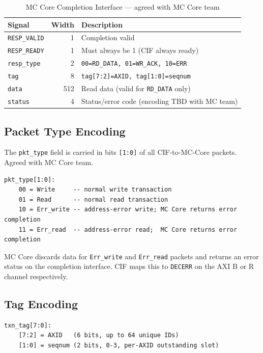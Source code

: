 \begin{table}[h]
\centering
\begin{tabular}{lrl}
\toprule
\textbf{Signal} & \textbf{Width} & \textbf{Description} \\
\midrule
\texttt{RESP\_VALID}    & 1   & Completion valid \\
\texttt{RESP\_READY}    & 1   & Must always be 1 (CIF always ready) \\
\texttt{resp\_type}     & 2   & \texttt{00=RD\_DATA, 01=WR\_ACK, 10=ERR} \\
\texttt{tag}            & 8   & \texttt{tag[7:2]=AXID, tag[1:0]=seqnum} \\
\texttt{data}           & 512 & Read data (valid for \texttt{RD\_DATA} only) \\
\texttt{status}         & 4   & Status/error code (encoding TBD with MC team) \\
\bottomrule
\end{tabular}
\caption{MC Core Completion Interface — agreed with MC Core team}
\end{table}

\subsection{Packet Type Encoding}

The \texttt{pkt\_type} field is carried in bits \texttt{[1:0]} of all CIF-to-MC-Core packets. Agreed with MC Core team.

\begin{lstlisting}
pkt_type[1:0]:
    00 = Write     -- normal write transaction
    01 = Read      -- normal read transaction
    10 = Err_write -- address-error write; MC Core returns error completion
    11 = Err_read  -- address-error read;  MC Core returns error completion
\end{lstlisting}

MC Core discards data for \texttt{Err\_write} and \texttt{Err\_read} packets and returns an error status on the completion interface. CIF maps this to \texttt{DECERR} on the AXI B or R channel respectively.

\subsection{Tag Encoding}

\begin{lstlisting}
txn_tag[7:0]:
    [7:2] = AXID   (6 bits, up to 64 unique IDs)
    [1:0] = seqnum (2 bits, 0-3, per-AXID outstanding slot)
\end{lstlisting}

